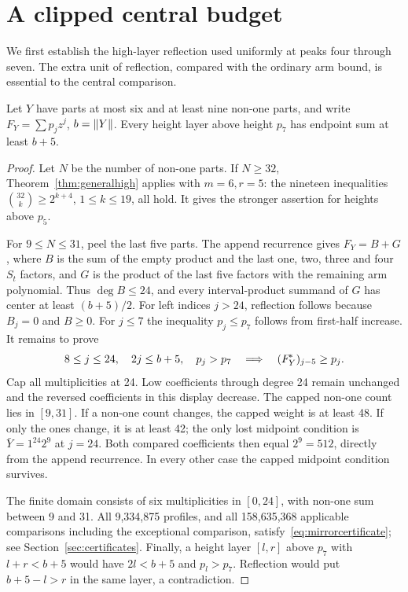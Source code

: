 \section{A clipped central budget}\label{sec:central}
We first establish the high-layer reflection used uniformly at peaks four through seven. The extra unit of reflection, compared with the ordinary arm bound, is essential to the central comparison.

\begin{theorem}\label{thm:highlayers}
Let $Y$ have parts at most six and at least nine non-one parts, and write $F_Y=\sum p_jz^j$, $b=\lVert Y\rVert$. Every height layer above height $p_7$ has endpoint sum at least $b+5$.
\end{theorem}
\begin{proof}
Let $N$ be the number of non-one parts. If $N\ge32$, Theorem~\ref{thm:generalhigh} applies with $m=6,r=5$: the nineteen inequalities $\binom{32}{k}\ge2^{k+4}$, $1\le k\le19$, all hold. It gives the stronger assertion for heights above $p_5$.

For $9\le N\le31$, peel the last five parts. The append recurrence gives $F_Y=B+G$, where $B$ is the sum of the empty product and the last one, two, three and four $S_t$ factors, and $G$ is the product of the last five factors with the remaining arm polynomial. Thus $\deg B\le24$, and every interval-product summand of $G$ has center at least $(b+5)/2$. For left indices $j>24$, reflection follows because $B_j=0$ and $B\ge0$. For $j\le7$ the inequality $p_j\le p_7$ follows from first-half increase. It remains to prove
\begin{equation}\label{eq:mirrorcertificate}
 8\le j\le24,\quad 2j\le b+5,\quad p_j>p_7
 \quad\Longrightarrow\quad (F_Y^{\!*})_{j-5}\ge p_j.
\end{equation}
Cap all multiplicities at 24. Low coefficients through degree 24 remain unchanged and the reversed coefficients in this display decrease. The capped non-one count lies in $[9,31]$. If a non-one count changes, the capped weight is at least 48. If only the ones change, it is at least 42; the only lost midpoint condition is $\bar Y=1^{24}2^9$ at $j=24$. Both compared coefficients then equal $2^9=512$, directly from the append recurrence. In every other case the capped midpoint condition survives.

The finite domain consists of six multiplicities in $[0,24]$, with non-one sum between 9 and 31. All 9,334,875 profiles, and all 158,635,368 applicable comparisons including the exceptional comparison, satisfy~\eqref{eq:mirrorcertificate}; see Section~\ref{sec:certificates}. Finally, a height layer $[l,r]$ above $p_7$ with $l+r<b+5$ would have $2l<b+5$ and $p_l>p_7$. Reflection would put $b+5-l>r$ in the same layer, a contradiction.
\end{proof}

